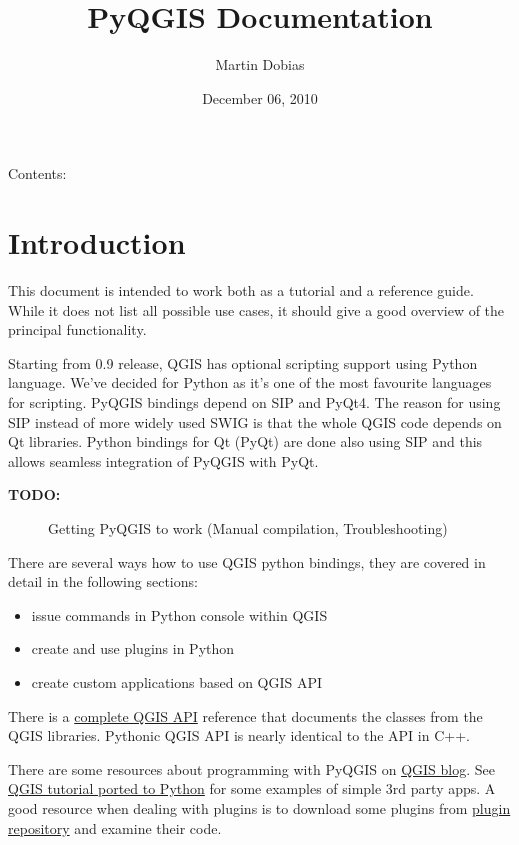 \documentclass[letterpaper,10pt,english]{manual}
\title{PyQGIS Documentation}
\date{December 06, 2010}
\author{Martin Dobias}
\begin{document}
\maketitle
\tableofcontents
\hypertarget{--doc-index}{}


Contents:

\resetcurrentobjects
\hypertarget{--doc-intro}{}

\hypertarget{introduction}{}\chapter{Introduction}

This document is intended to work both as a tutorial and a reference guide. While it does not list all possible use cases, it should give
a good overview of the principal functionality.

Starting from 0.9 release, QGIS has optional scripting support using Python language. We've decided for Python as it's one of the most favourite
languages for scripting. PyQGIS bindings depend on SIP and PyQt4. The reason for using SIP instead of more widely used SWIG is that the whole
QGIS code depends on Qt libraries. Python bindings for Qt (PyQt) are done also using SIP and this allows seamless integration of PyQGIS with PyQt.
\begin{description}
\item[\textbf{TODO:}] \leavevmode
Getting PyQGIS to work (Manual compilation, Troubleshooting)

\end{description}

There are several ways how to use QGIS python bindings, they are covered in detail in the following sections:
\begin{itemize}
\item {} 
issue commands in Python console within QGIS

\item {} 
create and use plugins in Python

\item {} 
create custom applications based on QGIS API

\end{itemize}

There is a \href{http://doc.qgis.org/}{complete QGIS API} reference that documents the classes from the QGIS libraries.
Pythonic QGIS API is nearly identical to the API in C++.

There are some resources about programming with PyQGIS on \href{http://blog.qgis.org/}{QGIS blog}.
See \href{http://blog.qgis.org/?q=node/59}{QGIS tutorial ported to Python} for some examples of simple 3rd party apps.
A good resource when dealing with plugins is to download some plugins from \href{http://pyqgis.org/}{plugin repository} and examine their code.
\end{document}
